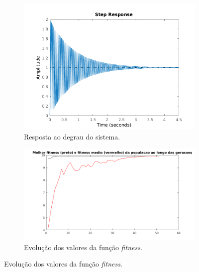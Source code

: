\begin {enumerate}
    \FloatBarrier
			    
	\begin{figure}[h!]
	
	\centering
	
		\begin{subfigure}{.5\textwidth}
		  \centering
		  \includegraphics[width=1\linewidth]{image/step_pid_ex_c}
		  \caption{Resposta ao degrau do sistema.}
		  \label{fig:pid_step_c}
		\end{subfigure}%
		\begin{subfigure}{.5\textwidth}
		  \centering
		  \includegraphics[width=1\linewidth]{image/melhor_fitness_pid_ex_c}
		  \caption{Evolução dos valores da função \textit{fitness}.}
		  \label{fig:pid_fitness_c}
		\end{subfigure}%
		

\end{figure}
\end{enumerate}
